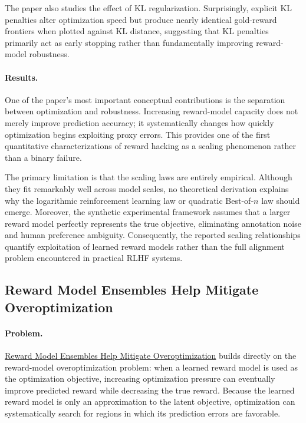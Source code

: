 \documentclass[11pt]{article}
\begin{document}
The paper also studies the effect of KL regularization. Surprisingly, explicit KL penalties alter optimization speed but produce nearly identical gold-reward frontiers when plotted against KL distance, suggesting that KL penalties primarily act as early stopping rather than fundamentally improving reward-model robustness.

\paragraph{Results.}
One of the paper's most important conceptual contributions is the separation between optimization and robustness. Increasing reward-model capacity does not merely improve prediction accuracy; it systematically changes how quickly optimization begins exploiting proxy errors. This provides one of the first quantitative characterizations of reward hacking as a scaling phenomenon rather than a binary failure.

The primary limitation is that the scaling laws are entirely empirical. Although they fit remarkably well across model scales, no theoretical derivation explains why the logarithmic reinforcement learning law or quadratic Best-of-$n$ law should emerge. Moreover, the synthetic experimental framework assumes that a larger reward model perfectly represents the true objective, eliminating annotation noise and human preference ambiguity. Consequently, the reported scaling relationships quantify exploitation of learned reward models rather than the full alignment problem encountered in practical RLHF systems.

\subsection{Reward Model Ensembles Help Mitigate Overoptimization}

\paragraph{Problem.}

\href{https://arxiv.org/pdf/2310.02743}{Reward Model Ensembles Help Mitigate Overoptimization}
 builds directly on the reward-model overoptimization problem: when a learned reward model is used as the optimization objective, increasing optimization pressure can eventually improve predicted reward while decreasing the true reward. Because the learned reward model is only an approximation to the latent objective, optimization can systematically search for regions in which its prediction errors are favorable.
\end{document}
